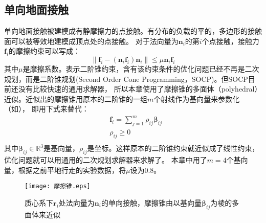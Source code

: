 \subsection{单向地面接触}
单向地面接触被建模成有静摩擦力的点接触。有分布的负载的平的，多边形的接触面可以被等效地建模成顶点处的点接触。
对于法向量为${{\boldsymbol{n}}_{i}}$的第$i$个点接触，接触力${{\boldsymbol{f}}_{i}}$的摩擦约束可以写成：
\begin{equation}
    \label{equ:friction_cone}
    \left\| {{\boldsymbol{f}}_{i}}-({{\boldsymbol{n}}_{i}}{{\boldsymbol{f}}_{i}}){{\boldsymbol{n}}_{i}} \right\|\le \mu {{\boldsymbol{n}}_{i}}{{\boldsymbol{f}}_{i}}
\end{equation}
其中$\mu$是摩擦系数。表示二阶锥约束，含有该约束条件的优化问题已经不再是二次规划，而是二阶锥规划(Second Order Cone Programming，SOCP)。但SOCP目前还没有比较快速的通用求解器，
所以本章使用了摩擦锥的多面体（polyhedral）近似\cite{pollard2001animation}。近似出的摩擦锥用原本的二阶锥的一组$m$个射线作为基向量来参数化（如），
即用下式来替代：
\begin{equation}
    \label{equ:friction_para}
    \begin{aligned}
        & {{\boldsymbol{f}}_{i}}=\sum\limits_{j=1}^{m}{{{\rho }_{ij}}{{\boldsymbol{\beta}}_{ij}}} \\ 
       & {{\rho }_{ij}}\ge 0 \\ 
      \end{aligned}      
\end{equation}
其中$\boldsymbol{\beta}_{ij} \in \mathbb{R}^3$是基向量，$\rho_{ij}$是坐标。这样原本的二阶锥约束就近似成了线性约束，优化问题就可以用通用的二次规划求解器来求解了。
本章中用了$m=4$个基向量，根据之前平地行走的实验数据，将$\mu$设为0.8。
\begin{figure}[htbp]
    \centering
    \texttt{[image: 摩擦锥.eps]}
    \caption{\label{fig:friction_cone}质心系下$\boldsymbol{r}_{i}$处法向量为${{\boldsymbol{n}}_{i}}$的单向接触，摩擦锥由以基向量$\boldsymbol{\beta}_{ij}$为棱的多面体来近似}
\end{figure}
